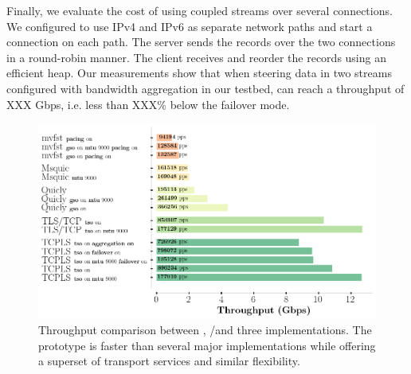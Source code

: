 Finally, we evaluate the cost of using coupled streams over several \tcp 
connections.
We configured \tcpls to use IPv4 and IPv6 as separate network paths and start a 
\tcp connection on each path. 
The \tcpls server sends the records over the two \tcp connections in a 
round-robin manner. The \tcpls client receives and reorder the records using an 
efficient heap.
Our measurements show that when steering data in two streams
configured with bandwidth aggregation in our testbed,
\tcpls can reach a throughput of XXX Gbps, i.e. less than XXX\% below the
failover mode.

\begin{figure}[!t]
  \begin{center}
    \includegraphics[width=\columnwidth]{figures/perf_analysis.png}
  \end{center}
\vspace{-0.5cm}
  \caption{Throughput comparison between \tcpls, \tcp/\tls and three \quic 
  implementations.
    The
    \tcpls prototype is faster than several major \quic implementations while
    offering a superset of transport services and similar flexibility.}
  \label{fig:perf}
\end{figure}


